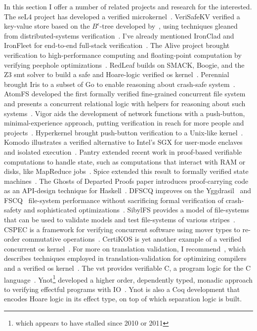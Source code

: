 In this section I offer a number of related projects and research for the
interested. The seL4 project has developed a verified
microkernel~\cite{Klein_EHACDEEKNSTW_09,Klein_AEHCDEEKNSTW_10,Klein_AEMSKH_14,Klein_AKMHF_18}.
VeriSafeKV verified a key-value store based on the \(B^\epsilon\)-tree developed
by~\cite{188458}, using techniques gleaned from distributed-systems
verification~\cite{258969}. I've already mentioned IronClad and IronFleet for
end-to-end full-stack
verification~\cite{hawblitzel2014ironclad,hawblitzel2015ironfleet}. The Alive
project brought verification to high-performance computing and floating-point
computation by verifying peephole
optimizations~\cite{Lopes_2018,Menendez_2016,Lopes_2015}. RedLeaf builds on
SMACK, Boogie, and the Z3 \gls{smt} solver to build a safe and Hoare-logic
verified \gls{os} kernel~\cite{Narayanan_2019,Narayan_2020}. Perennial brought
Iris to a subset of Go to enable reasoning about crash-safe
system~\cite{Chajed_2019}. AtomFS developed the first formally verified
fine-grained concurrent file system and presents a concurrent relational logic
with helpers for reasoning about such systems~\cite{Zou_2019}. Vigor aids the
development of network functions with a push-button, minimal-experience
approach, putting verification in reach for more people and
projects~\cite{Zaostrovnykh_2019}. Hyperkernel brought push-button verification
to a Unix-like kernel~\cite{Nelson_2017}. Komodo illustrates a verified
alternative to Intel's SGX for user-mode enclaves and isolated
execution~\cite{Ferraiuolo_2017}. Pantry extended recent work in proof-based
verifiable computations to handle state, such as computations that interact with
RAM or disks, like MapReduce jobs~\cite{Braun_2013}. Spice extended this result
to formally verified state machines~\cite{222621}. The Ghosts of Departed Proofs
paper introduces proof-carrying code as an API-design technique for
Haskell~\cite{Noonan_2018}. DFSCQ improves on the
Yggdrasil~\cite{Sigurbjarnarson_2016} and FSCQ~\cite{Chen_2015} file-system
performance without sacrificing formal verification of crash-safety and
sophisticated optimizations~\cite{Chen_2017}. SibylFS provides a model of
file-systems that can be used to validate models and test file-systems of
various stripes~\cite{Ridge_2015}. CSPEC is a framework for verifying concurrent
software using mover types to re-order commutative operations~\cite{222565}.
CertiKOS is yet another example of a verified concurrent \gls{os}
kernel~\cite{199344}. For more on translation validation, I
recommend~\cite{Pnueli_1998}, which describes techniques employed in
translation-validation for optimizing compilers~\cite{Necula_2000} and a
verified \gls{os} kernel~\cite{Sewell_2013}. The \gls{vst} provides verifiable
C, a program logic for the C language~\cite{VST,Appel_2011}. Ynot\footnote{which
appears to have stalled since 2010 or 2011} developed a higher order,
dependently typed, monadic approach to verifying effectful programs with
IO~\cite{Nanevski08ynot:reasoning}. Ynot is also a Coq development that encodes
Hoare logic in its effect type, on top of which separation logic is built.
